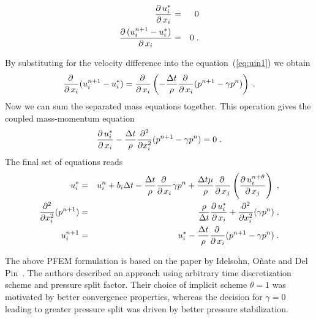 \begin{eqnarray}\label{rce:mass}
	\mbox{$\displaystyle\frac{\partial \,{u^*_i}}{\partial \,{x_i}}$} &=& 0 \\
      \mbox{$\displaystyle\frac{\partial \,{(u^{n+1}_i-u^*_i)}}{\partial \,{x_i}}$} &=& 0\;.
\end{eqnarray}

By substituting for the velocity difference into the equation~(\ref{eq:uin1}) we obtain
\begin{equation}
\mbox{$\displaystyle\frac{\partial \,{}}{\partial \,{x_i}}$}(u^{n+1}_i - u^*_i) = \mbox{$\displaystyle\frac{\partial \,{}}{\partial \,{x_i}}$}\left(-\frac{\Delta t}{\rho}\mbox{$\displaystyle\frac{\partial \,{}}{\partial \,{x_i}}$}(p^{n+1}-\gamma p^n)\right)\;.
\end{equation}
Now we can sum the separated mass equations together. This operation gives the coupled mass-momentum equation
\begin{equation}
  \mbox{$\displaystyle\frac{\partial \,{u^*_i}}{\partial \,{x_i}}$} - \frac{\Delta t}{\rho}\frac{\partial^2}{\partial x^2_i}(p^{n+1}-\gamma p^n) = 0\;.
\end{equation}
The final set of equations reads
\begin{eqnarray}
u^*_i  &=& u^n_i+b_i\Delta t - \frac{\Delta t}{\rho}\mbox{$\displaystyle\frac{\partial \,{}}{\partial \,{x_i}}$}\gamma p^n+\frac{\Delta t\mu}{\rho}\mbox{$\displaystyle\frac{\partial \,{}}{\partial \,{x_j}}$}\left(\mbox{$\displaystyle\frac{\partial \,{u^{n+\theta}_i}}{\partial \,{x_j}}$}\right)\;,\\
\frac{\partial^2}{\partial x^2_i}(p^{n+1}) &=& \frac{\rho}{\Delta t}\mbox{$\displaystyle\frac{\partial \,{u^*_i}}{\partial \,{x_i}}$}+\frac{\partial^2}{\partial x^2_i}(\gamma p^n)\;, \\
u^{n+1}_i &=& u^*_i- \frac{\Delta t}{\rho}\mbox{$\displaystyle\frac{\partial \,{}}{\partial \,{x_i}}$}(p^{n+1}-\gamma p^n)\;.
\end{eqnarray}
\par
The above PFEM formulation is based on the paper by Idelsohn, O\~nate and Del Pin~\cite{Idelsohn04}. The authors described an approach using arbitrary time discretization scheme and pressure split factor. Their choice of implicit scheme $\theta = 1$ was motivated by better convergence properties, whereas the decision for $\gamma = 0$ leading to greater pressure split was driven by better pressure stabilization.
